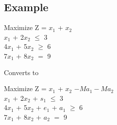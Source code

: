 \documentclass[12pt,a4paper]{article}
\begin{document}
\subsection*{Example}
\begin{center}
Maximize
Z = $x_1$ + $x_2$ \\
$x_1$ + 2$x_2$ $\leq$ 3 \\
4$x_1$ + 5$x_2$ $\geq$ 6 \\
7$x_1$ + 8$x_2$ $=$ 9 \\
\end{center}

Converts to

\begin{center}
Maximize
Z = $x_1$ + $x_2$ $- Ma_1 - Ma_2$ \\
$x_1$ + 2$x_2$ + $s_1$ $\leq$ 3 \\
4$x_1$ + 5$x_2$ + $e_1$ + $a_1$ $\geq$ 6 \\
7$x_1$ + 8$x_2$ + $a_2$ $=$ 9 \\
\end{center}
\end{document}
